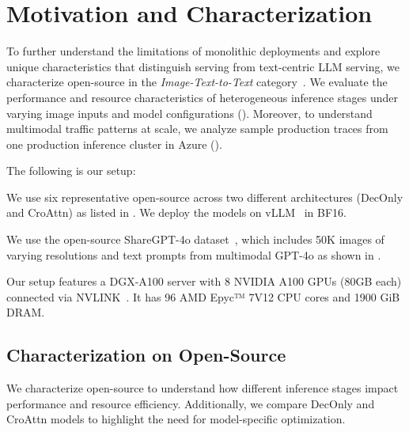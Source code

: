 \section{Motivation and \lmm{} Characterization}
\label{sec:characterization}

To further understand the limitations of monolithic deployments and explore unique characteristics that distinguish \lmm{} serving from text-centric LLM serving, we characterize open-source \lmms{} in the \emph{Image-Text-to-Text} category~\cite{ittt}.
We evaluate the performance and resource characteristics of heterogeneous inference stages under varying image inputs and model configurations ().
Moreover, to understand multimodal traffic patterns at scale, we analyze sample production traces from one production \lmm{} inference cluster in Azure ().





The following is our setup:

We use six representative open-source \lmms{} across two different architectures (DecOnly and CroAttn) as listed in . We deploy the models on vLLM~\cite{vllm} in BF16.

We use the open-source ShareGPT-4o dataset~\cite{chen2024far}, which includes 50K images of varying resolutions and text prompts from multimodal GPT-4o as shown in .


Our setup features a DGX-A100 server with 8 NVIDIA A100 GPUs (80GB each) connected via NVLINK~\cite{a100azure}.
It has 96 AMD Epyc™ 7V12 CPU cores and 1900 GiB DRAM.



\subsection{Characterization on Open-Source \lmms}
\label{sec:characterization:open-source}
We characterize open-source \lmms{} to understand how different inference stages impact performance and resource efficiency.
Additionally, we compare DecOnly and CroAttn models to highlight the need for model-specific optimization.



